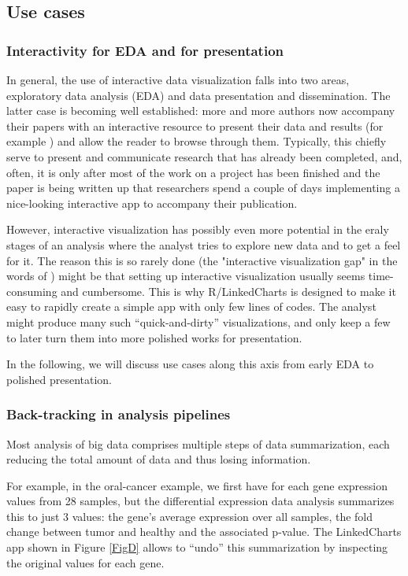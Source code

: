 \documentclass[twocolumn,10pt]{article}
\begin{document}
\subsection{Use cases}

\subsubsection{Interactivity for EDA and for presentation}

In general, the use of interactive data visualization falls into two areas, exploratory data analysis (EDA) and data presentation and dissemination. The latter case is becoming well established: more and more authors now accompany their papers with an interactive resource to present their data and results (for example \citet{travaglini_2020, roider_2020, kalucka_2020}) and allow the reader to browse through them. Typically, this chiefly serve to present and communicate research that has already been completed, and, often, it is only after most of the work on a project has been finished and the paper is being written up that researchers spend a couple of days implementing a nice-looking interactive app to accompany their publication.

However, interactive visualization has possibly even more potential in the eraly stages of an analysis where the analyst tries to explore new data and to get a feel for it. The reason this is so rarely done (the "interactive visualization gap" in the words of \citet{batch_2017}) might be that setting up interactive visualization usually seems time-consuming and cumbersome. This is why R/LinkedCharts is designed to make it easy to rapidly create a simple app with only few lines of codes. The analyst might produce many such ``quick-and-dirty'' visualizations, and only keep a few to later turn them into more polished works for presentation.

In the following, we will discuss use cases along this axis from early EDA to polished presentation.


\subsubsection{Back-tracking in analysis pipelines}

Most analysis of big data comprises multiple steps of data summarization, each reducing the total amount of data and thus losing information.

For example, in the oral-cancer example, we first have for each gene expression values from 28 samples, but the differential expression data analysis summarizes this to just 3 values: the gene's average expression over all samples, the fold change between tumor and healthy and the associated p-value. The LinkedCharts app shown in Figure \ref{FigD} allows to ``undo'' this summarization by inspecting the original values for each gene.
\end{document}
